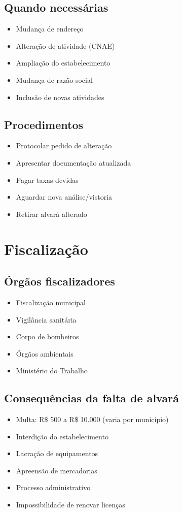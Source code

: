 \documentclass[12pt,a4paper]{article}
\begin{document}
\subsection{Quando necessárias}
\begin{itemize}
    \item Mudança de endereço
    \item Alteração de atividade (CNAE)
    \item Ampliação do estabelecimento
    \item Mudança de razão social
    \item Inclusão de novas atividades
\end{itemize}

\subsection{Procedimentos}
\begin{itemize}
    \item Protocolar pedido de alteração
    \item Apresentar documentação atualizada
    \item Pagar taxas devidas
    \item Aguardar nova análise/vistoria
    \item Retirar alvará alterado
\end{itemize}

\section{Fiscalização}

\subsection{Órgãos fiscalizadores}
\begin{itemize}
    \item Fiscalização municipal
    \item Vigilância sanitária
    \item Corpo de bombeiros
    \item Órgãos ambientais
    \item Ministério do Trabalho
\end{itemize}

\subsection{Consequências da falta de alvará}
\begin{itemize}
    \item Multa: R\$ 500 a R\$ 10.000 (varia por município)
    \item Interdição do estabelecimento
    \item Lacração de equipamentos
    \item Apreensão de mercadorias
    \item Processo administrativo
    \item Impossibilidade de renovar licenças
\end{itemize}
\end{document}
